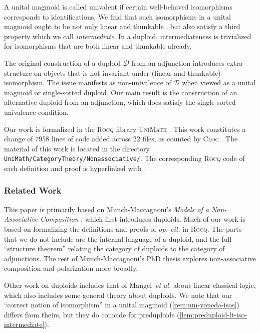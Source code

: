 \documentclass[runningheads]{llncs}
\makeatletter
\newcommand*{\opcit}{\textit{op.\@{} cit.\@}}
\newcommand*{\etal}{~\textit{et al.\@}}
\newcommand*\rocqlogo{\usebox{\rocqlogobox}}
\newcommand{\orgcode}[1]{\textup{\texttt{#1}}}
\newcommand{\acat}[1]{\mathcal{#1}}
\newcommand{\D}{\acat{D}}
\makeatother
\begin{document}
A unital magmoid is called univalent if certain well\hyp{}behaved
isomorphisms corresponds to identifications. We find that such
isomorphisms in a unital magmoid ought to be not only linear
\cite{MunchMaccagnoni14} and thunkable \cite{Fuhrmann99}, but also
satisfy a third property which we call \emph{intermediate}. In a duploid,
intermediateness is trivialized for isomorphisms that are both linear
and thunkable already.

The original construction of a duploid \(\D\) from an adjunction
\cite{MunchMaccagnoni14,Mangel25} introduces extra structure on
objects that is not invariant under (linear\hyp{}and\hyp{}thunkable)
isomorphism. The issue manifests as non\hyp{}univalence of \(\D\) when
viewed as a unital magmoid or single\hyp{}sorted duploid. Our main result
is the construction of an alternative duploid from an adjunction,
which does satisfy the single\hyp{}sorted univalence condition.

Our work is formalized in the \textsc{Rocq} library \textsc{UniMath}
\cite{UniMath}. This work constitutes a change of 7958 lines of code added across 22 files, as
counted by \textsc{Cloc} \cite{Cloc}. The material of this work is
located in the directory \orgcode{UniMath/CategoryTheory/Nonassociative/}.
The corresponding \textsc{Rocq} code of each definition and proof is
hyperlinked with \rocqlogo{}.

\subsubsection{Related Work} This paper is primarily based on
Munch\hyp{}Maccagnoni's \emph{Models of a Non\hyp{}Associative Composition}
\cite{MunchMaccagnoni14,MunchMaccagnoni13}, which first
introduces duploids. Much of our work is based on formalizing the
definitions and proofs of \opcit{} in \textsc{Rocq}. The parts that we do
not include are the internal language of a duploid, and the full
``structure theorem'' relating the category of duploids to the category
of adjunctions. The rest of Munch\hyp{}Maccagnoni's PhD thesis
\cite{MunchMaccagnoni13} explores non\hyp{}associative composition and
polarization more broadly.

Other work on duploids includes that of Mangel\etal{} \cite{Mangel25}
about linear classical logic, which also includes some general theory
about duploids. We note that our ``correct notion of isomorphism'' in a
unital magmoid (\autoref{rem:um-yoneda-isos}) differs from theirs, but they do
coincide for preduploids (\autoref{lem:preduploid-lt-iso-intermediate}).
\end{document}
